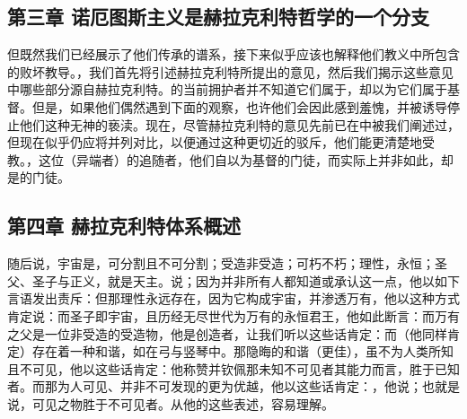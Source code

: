 
\subsection{第三章 诺厄图斯主义是赫拉克利特哲学的一个分支}

但既然我们已经展示了他们传承的谱系，接下来似乎应该也解释他们教义中所包含的败坏教导。，我们首先将引述赫拉克利特所提出的意见，然后我们揭示这些意见中哪些部分源自赫拉克利特。的当前拥护者并不知道它们属于，却以为它们属于基督。但是，如果他们偶然遇到下面的观察，也许他们会因此感到羞愧，并被诱导停止他们这种无神的亵渎。现在，尽管赫拉克利特的意见先前已在中被我们阐述过，但现在似乎仍应将并列对比，以便通过这种更切近的驳斥，他们能更清楚地受教。，这位（异端者）的追随者，他们自以为基督的门徒，而实际上并非如此，却是的门徒。\par


\subsection{第四章 赫拉克利特体系概述}

随后说，宇宙是，可分割且不可分割；受造非受造；可朽不朽；理性，永恒；圣父、圣子与正义，就是天主。说；因为并非所有人都知道或承认这一点，他以如下言语发出责斥：但那理性永远存在，因为它构成宇宙，并渗透万有，他以这种方式肯定说：而圣子即宇宙，且历经无尽世代为万有的永恒君王，他如此断言：而万有之父是一位非受造的受造物，他是创造者，让我们听以这些话肯定：而（他同样肯定）存在着一种和谐，如在弓与竖琴中。那隐晦的和谐（更佳），虽不为人类所知且不可见，他以这些话肯定：他称赞并钦佩那未知不可见者其能力而言，胜于已知者。而那为人可见、并非不可发现的更为优越，他以这些话肯定：，他说；也就是说，可见之物胜于不可见者。从他的这些表述，容易理解。\par

